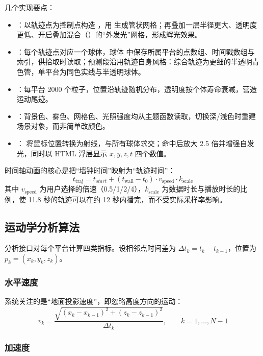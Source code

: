 几个实现要点：

\begin{itemize}
  \item {}：以轨迹点为控制点构造 ，用  生成管状网格；再叠加一层半径更大、透明度更低、开启叠加混合（）的“外发光”网格，形成辉光效果。
  \item {}：每个轨迹点对应一个球体，球体  中保存所属平台的点数组、时间戳数组与索引，供拾取时读取；预测段沿用轨迹自身风格：综合轨迹为更细的半透明青色管，单平台为同色实线与半透明球体。
  \item {}：每平台 2000 个粒子，位置沿轨迹随机分布，透明度按个体寿命衰减，营造运动尾迹。
  \item {}：背景色、雾色、网格色、光照强度均从主题函数读取，切换深/浅色时重建场景对象，而非简单改颜色。
  \item {}： 将鼠标位置转换为射线，与所有球体求交；命中后放大 2.5 倍并增强自发光，同时以 HTML 浮层显示 $x,y,z,t$ 四个数值。
\end{itemize}

时间轴动画的核心是把“墙钟时间”映射为“轨迹时间”：
\begin{equation}
t_{\text{traj}} = t_{start} + \left(t_{\text{wall}} - t_0\right)\cdot v_{\text{speed}}\cdot k_{\text{scale}}
\end{equation}
其中 $v_{\text{speed}}$ 为用户选择的倍速（0.5/1/2/4），$k_{\text{scale}}$ 为数据时长与播放时长的比例，使 11.8 秒的轨迹可以在约 12 秒内播完，而不受实际采样率影响。

\subsection{运动学分析算法}

分析接口对每个平台计算四类指标。设相邻点时间差为 $\Delta t_k = t_k-t_{k-1}$，位置为 $p_k=(x_k,y_k,z_k)$。

\subsubsection{水平速度}

系统关注的是“地面投影速度”，即忽略高度方向的运动：
\begin{equation}
v_k=\frac{\sqrt{(x_k-x_{k-1})^2+(z_k-z_{k-1})^2}}{\Delta t_k},\qquad k=1,\dots,N-1
\end{equation}

\subsubsection{加速度}

